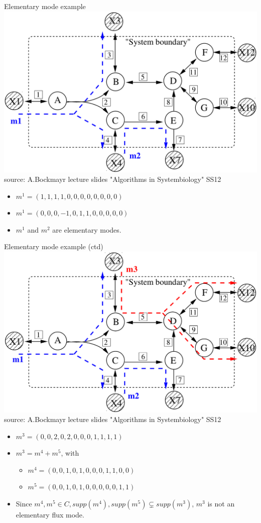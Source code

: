 \documentclass{beamer}
\begin{document}
\begin{frame}{Elementary mode example}
    \includegraphics[width=.65\textwidth]{grafik/EMnet1}
    \\
    \hfill \tiny{source: A.Bockmayr lecture slides "Algorithms in Systembiology" SS12}
    \normalsize
    \begin{itemize}
        \item $m^{1} = (1, 1, 1, 1, 0, 0, 0, 0, 0, 0, 0 ,0)$
        \item $m^{1} = (0, 0, 0, -1, 0, 1, 1, 0, 0, 0, 0 ,0)$
\pause
        \item $m^{1}$ and $m^{2}$ are elementary modes.
    \end{itemize}
\end{frame}

\begin{frame}{Elementary mode example (ctd)}
    \includegraphics[width=.65\textwidth]{grafik/EMnet2}
    \\
    \hfill \tiny{source: A.Bockmayr lecture slides "Algorithms in Systembiology" SS12}
    \normalsize
    \begin{itemize}
        \item $m^{3} = (0, 0, 2, 0, 2, 0, 0, 0, 1, 1, 1 ,1)$
\pause
        \item $m^{3} = m^{4} + m^{5}$, with
        \begin{itemize}
            \item $ m^{4} = (0, 0, 1, 0, 1, 0, 0, 0, 1, 1, 0 ,0)$
            \item $ m^{5} = (0, 0, 1, 0, 1, 0, 0, 0, 0, 0, 1 ,1)$
        \end{itemize}
        \item Since $m^{4}, m^{5} \in C, supp(m^{4}), supp(m^{5}) \subsetneq supp(m^{3})$, 
        $m^{3}$ is not an elementary flux mode.
    \end{itemize}
\end{frame}
\end{document}
